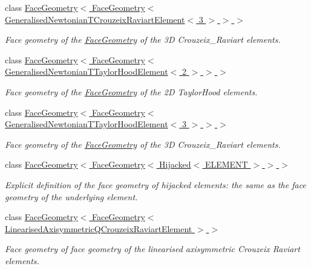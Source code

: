 \begin{DoxyCompactItemize}
class \hyperlink{classoomph_1_1FaceGeometry_3_01FaceGeometry_3_01GeneralisedNewtonianTCrouzeixRaviartElement_3_013_01_4_01_4_01_4}{Face\+Geometry$<$ Face\+Geometry$<$ Generalised\+Newtonian\+T\+Crouzeix\+Raviart\+Element$<$ 3 $>$ $>$ $>$}
\begin{DoxyCompactList}\small\item\em Face geometry of the \hyperlink{classoomph_1_1FaceGeometry}{Face\+Geometry} of the 3D Crouzeix\+\_\+\+Raviart elements. \end{DoxyCompactList}\item 
class \hyperlink{classoomph_1_1FaceGeometry_3_01FaceGeometry_3_01GeneralisedNewtonianTTaylorHoodElement_3_012_01_4_01_4_01_4}{Face\+Geometry$<$ Face\+Geometry$<$ Generalised\+Newtonian\+T\+Taylor\+Hood\+Element$<$ 2 $>$ $>$ $>$}
\begin{DoxyCompactList}\small\item\em Face geometry of the \hyperlink{classoomph_1_1FaceGeometry}{Face\+Geometry} of the 2D Taylor\+Hood elements. \end{DoxyCompactList}\item 
class \hyperlink{classoomph_1_1FaceGeometry_3_01FaceGeometry_3_01GeneralisedNewtonianTTaylorHoodElement_3_013_01_4_01_4_01_4}{Face\+Geometry$<$ Face\+Geometry$<$ Generalised\+Newtonian\+T\+Taylor\+Hood\+Element$<$ 3 $>$ $>$ $>$}
\begin{DoxyCompactList}\small\item\em Face geometry of the \hyperlink{classoomph_1_1FaceGeometry}{Face\+Geometry} of the 3D Crouzeix\+\_\+\+Raviart elements. \end{DoxyCompactList}\item 
class \hyperlink{classoomph_1_1FaceGeometry_3_01FaceGeometry_3_01Hijacked_3_01ELEMENT_01_4_01_4_01_4}{Face\+Geometry$<$ Face\+Geometry$<$ Hijacked$<$ E\+L\+E\+M\+E\+N\+T $>$ $>$ $>$}
\begin{DoxyCompactList}\small\item\em Explicit definition of the face geometry of hijacked elements\+: the same as the face geometry of the underlying element. \end{DoxyCompactList}\item 
class \hyperlink{classoomph_1_1FaceGeometry_3_01FaceGeometry_3_01LinearisedAxisymmetricQCrouzeixRaviartElement_01_4_01_4}{Face\+Geometry$<$ Face\+Geometry$<$ Linearised\+Axisymmetric\+Q\+Crouzeix\+Raviart\+Element $>$ $>$}
\begin{DoxyCompactList}\small\item\em Face geometry of face geometry of the linearised axisymmetric Crouzeix Raviart elements. \end{DoxyCompactList}\item 

\end{DoxyCompactItemize}
